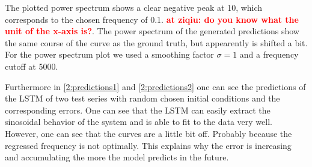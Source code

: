 The plotted power spectrum shows a clear negative peak at 10, which corresponds to the chosen frequency of 0.1. \textcolor{red}{\textbf{at ziqiu: do you know what the unit of the x-axis is?}}. The power spectrum of the generated predictions show the same course of the curve as the ground truth, but appearently is shifted a bit. For the power spectrum plot we used a smoothing factor $\sigma=1$ and a frequency cutoff at 5000.

\FloatBarrier
Furthermore in \cref{2:predictions1} and \cref{2:predictions2} one can see the predictions of the LSTM of two test series with random chosen initial conditions and the corresponding errors. One can see that the LSTM can easily extract the sinosoidal behavior of the system and is able to fit to the data very well. However, one can see that the curves are a little bit off. Probably because the regressed frequency is not optimally. This explains why the error is increasing and accumulating the more the model predicts in the future.
